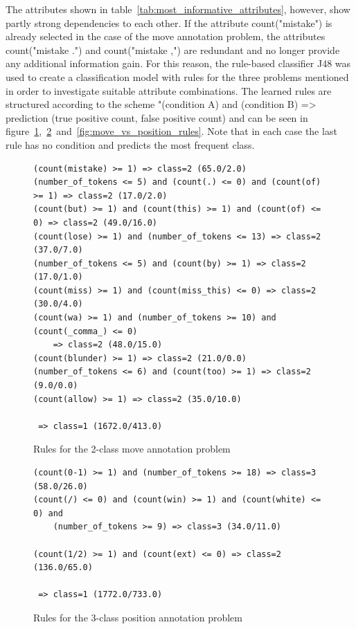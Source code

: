 \documentclass[article,type=msc,colorback,accentcolor=tud7b]{tudthesis}
\begin{document}
    The attributes shown in table~\ref{tab:most_informative_attributes}, however, show partly strong dependencies to each other. If the attribute count("mistake") is already selected in the case of the move annotation problem, the attributes count("mistake .") and count("mistake ,") are redundant and no longer provide any additional information gain. For this reason, the rule-based classifier J48 was used to create a classification model with rules for the three problems mentioned in order to investigate suitable attribute combinations. The learned rules are structured according to the scheme "(condition A) and (condition B) => prediction (true positive count, false positive count) and can be seen in figure~\ref{fig:move_rules},~\ref{fig:position_rules}~and~\ref{fig:move_vs_position_rules}. Note that in each case the last rule has no condition and predicts the most frequent class.
        
	\begin{figure}[H]
	  \centering
	  \begin{lstlisting}	  
(count(mistake) >= 1) => class=2 (65.0/2.0)
(number_of_tokens <= 5) and (count(.) <= 0) and (count(of) >= 1) => class=2 (17.0/2.0)
(count(but) >= 1) and (count(this) >= 1) and (count(of) <= 0) => class=2 (49.0/16.0)
(count(lose) >= 1) and (number_of_tokens <= 13) => class=2 (37.0/7.0)
(number_of_tokens <= 5) and (count(by) >= 1) => class=2 (17.0/1.0)
(count(miss) >= 1) and (count(miss_this) <= 0) => class=2 (30.0/4.0)
(count(wa) >= 1) and (number_of_tokens >= 10) and (count(_comma_) <= 0) 
	=> class=2 (48.0/15.0)
(count(blunder) >= 1) => class=2 (21.0/0.0)
(number_of_tokens <= 6) and (count(too) >= 1) => class=2 (9.0/0.0)
(count(allow) >= 1) => class=2 (35.0/10.0)

 => class=1 (1672.0/413.0)
	  \end{lstlisting}
      \caption{Rules for the 2-class move annotation problem}
      \label{fig:move_rules}
	\end{figure}
	
	\begin{figure}[H]
	  \centering
	  \begin{lstlisting}	  
(count(0-1) >= 1) and (number_of_tokens >= 18) => class=3 (58.0/26.0)
(count(/) <= 0) and (count(win) >= 1) and (count(white) <= 0) and 
	(number_of_tokens >= 9) => class=3 (34.0/11.0)
	
(count(1/2) >= 1) and (count(ext) <= 0) => class=2 (136.0/65.0)

 => class=1 (1772.0/733.0)
	  \end{lstlisting}
      \caption{Rules for the 3-class position annotation problem}
      \label{fig:position_rules}
	\end{figure}
	
\end{document}

